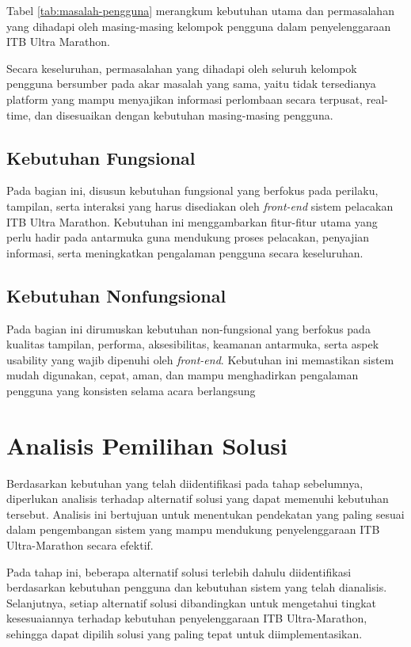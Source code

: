 Tabel \ref{tab:masalah-pengguna} merangkum kebutuhan utama dan permasalahan
yang dihadapi oleh masing-masing kelompok pengguna dalam penyelenggaraan ITB
Ultra Marathon.



Secara keseluruhan, permasalahan yang dihadapi oleh seluruh kelompok pengguna
bersumber pada akar masalah yang sama, yaitu tidak tersedianya platform yang
mampu menyajikan informasi perlombaan secara terpusat, real-time, dan
disesuaikan dengan kebutuhan masing-masing pengguna.

\subsection{Kebutuhan Fungsional}
Pada bagian ini, disusun kebutuhan fungsional yang berfokus pada perilaku, tampilan, serta interaksi yang harus disediakan oleh \textit{front-end} sistem pelacakan ITB Ultra Marathon. Kebutuhan ini menggambarkan fitur-fitur utama yang perlu hadir pada antarmuka guna mendukung proses pelacakan, penyajian informasi, serta meningkatkan pengalaman pengguna secara keseluruhan.


\subsection{Kebutuhan Nonfungsional}
Pada bagian ini dirumuskan kebutuhan non-fungsional yang berfokus pada kualitas tampilan, performa, aksesibilitas, keamanan antarmuka, serta aspek usability yang wajib dipenuhi oleh \textit{front-end}. Kebutuhan ini memastikan sistem mudah digunakan, cepat, aman, dan mampu menghadirkan pengalaman pengguna yang konsisten selama acara berlangsung


\section{Analisis Pemilihan Solusi}
Berdasarkan kebutuhan yang telah diidentifikasi pada tahap sebelumnya, diperlukan analisis terhadap alternatif solusi yang dapat memenuhi kebutuhan tersebut. Analisis ini bertujuan untuk menentukan pendekatan yang paling sesuai dalam pengembangan sistem yang mampu mendukung penyelenggaraan ITB Ultra-Marathon secara efektif.

Pada tahap ini, beberapa alternatif solusi terlebih dahulu diidentifikasi berdasarkan kebutuhan pengguna dan kebutuhan sistem yang telah dianalisis. Selanjutnya, setiap alternatif solusi dibandingkan untuk mengetahui tingkat kesesuaiannya terhadap kebutuhan penyelenggaraan ITB Ultra-Marathon, sehingga dapat dipilih solusi yang paling tepat untuk diimplementasikan.

